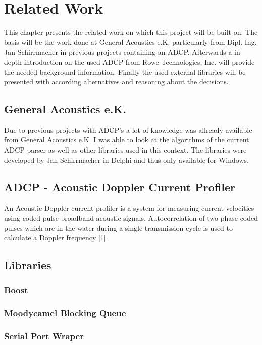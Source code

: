 \chapter{Related Work}
This chapter presents the related work on which this project will be built on. The basis will be the work done at General Acoustics e.K. particularly from Dipl. Ing. Jan Schirrmacher in previous projects containing an ADCP. Afterwards a in-depth introduction on the used ADCP from Rowe Technologies, Inc. will provide the needed background information. Finally the used external libraries will be presented with according alternatives and reasoning about the decisions.

\section{General Acoustics e.K.}
Due to previous projects with ADCP's a lot of knowledge was allready available from General Acoustics e.K. I was able to look at the algorithms of the current ADCP parser as well as other libraries used in this context. The libraries were developed by Jan Schirrmacher in Delphi and thus only available for Windows.\\

\section{ADCP - Acoustic Doppler Current Profiler}
An Acoustic Doppler current profiler is a system for measuring current velocities using coded-pulse broadband acoustic signals. Autocorrelation of two phase coded pulses which are in the water during a single transmission cycle is used to calculate a Doppler frequency [1].
\section{Libraries}

\subsection{Boost}

\subsection{Moodycamel Blocking Queue}

\subsection{Serial Port Wraper}